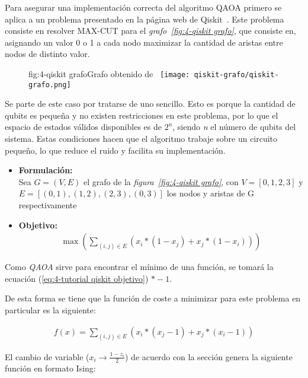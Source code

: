 Para asegurar una implementación correcta del algoritmo QAOA primero se aplica a un problema presentado en la página web de Qiskit~\cite{qiskit_tutorial_antiguo}.
Este problema consiste en resolver MAX-CUT para el \textit{grafo~\ref{fig:4-qiskit grafo}}, que consiste en, asignando un valor 0 o 1 a cada nodo maximizar la cantidad de aristas entre nodos de distinto valor.

\begin{figure}[htbp]{fig:4-qiskit grafo}{Grafo obtenido de\textit{~\cite{qiskit_tutorial_antiguo}}}
  \centering
  \texttt{[image: qiskit-grafo/qiskit-grafo.png]}
\end{figure}

Se parte de este caso por tratarse de uno sencillo. Esto es porque la cantidad de qubits es pequeña y no existen restricciones en este problema, por lo que el espacio de estados válidos disponibles es de $2^n$, siendo \textit{n} el número de qubits del sistema. Estas condiciones hacen que el algoritmo trabaje sobre un circuito pequeño, lo que reduce el ruido y facilita su implementación.

\begin{itemize}
\item \textbf{Formulación:} \\
  Sea $G = (V, E)$ el grafo de la \textit{figura~\ref{fig:4-qiskit grafo}}, con $V = [0, 1, 2, 3]$ y $E = [(0, 1), (1, 2), (2, 3), (0, 3)]$ los nodos y aristas de G respectivamente

\item \textbf{Objetivo:} \\
  \begin{align}\label{eq:4-tutorial qiskit objetivo}
    \max(\sum_{(i, j) \in E} (x_i * (1 - x_j) + x_j * (1 - x_i)))
  \end{align}

\end{itemize}

Como \textit{QAOA} sirve para encontrar el mínimo de una función, se tomará la ecuación (\ref{eq:4-tutorial qiskit objetivo}) $*-1$.

De esta forma se tiene que la función de coste a minimizar para este problema en particular es la siguiente:

\begin{align*}
  f(x) = \sum_{(i, j) \in E} (x_i * (x_j - 1) + x_j * (x_i - 1))
\end{align*}

El cambio de variable ($x_i \rightarrow \frac{1 - z_i}{2}$) de acuerdo con la sección  %
genera la siguiente función en formato Ising:

